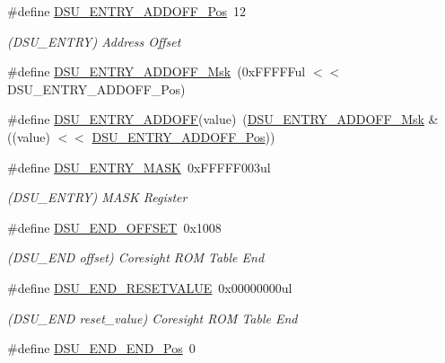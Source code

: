 \begin{DoxyCompactItemize}
\item 
\#define \mbox{\hyperlink{group___s_a_m_d21___d_s_u_gab71d31f158a348f32e1a357991d598e4}{D\+S\+U\+\_\+\+E\+N\+T\+R\+Y\+\_\+\+A\+D\+D\+O\+F\+F\+\_\+\+Pos}}~12
\begin{DoxyCompactList}\small\item\em (D\+S\+U\+\_\+\+E\+N\+T\+RY) Address Offset \end{DoxyCompactList}\item 
\#define \mbox{\hyperlink{group___s_a_m_d21___d_s_u_ga5aed4c8d11cb4035eb6e903e323f1bd2}{D\+S\+U\+\_\+\+E\+N\+T\+R\+Y\+\_\+\+A\+D\+D\+O\+F\+F\+\_\+\+Msk}}~(0x\+F\+F\+F\+F\+Ful $<$$<$ D\+S\+U\+\_\+\+E\+N\+T\+R\+Y\+\_\+\+A\+D\+D\+O\+F\+F\+\_\+\+Pos)
\item 
\#define \mbox{\hyperlink{group___s_a_m_d21___d_s_u_ga2b06caa1302db199b3b62849e2b5200f}{D\+S\+U\+\_\+\+E\+N\+T\+R\+Y\+\_\+\+A\+D\+D\+O\+FF}}(value)~(\mbox{\hyperlink{group___s_a_m_d21___d_s_u_ga5aed4c8d11cb4035eb6e903e323f1bd2}{D\+S\+U\+\_\+\+E\+N\+T\+R\+Y\+\_\+\+A\+D\+D\+O\+F\+F\+\_\+\+Msk}} \& ((value) $<$$<$ \mbox{\hyperlink{group___s_a_m_d21___d_s_u_gab71d31f158a348f32e1a357991d598e4}{D\+S\+U\+\_\+\+E\+N\+T\+R\+Y\+\_\+\+A\+D\+D\+O\+F\+F\+\_\+\+Pos}}))
\item 
\#define \mbox{\hyperlink{group___s_a_m_d21___d_s_u_gaf0cc765a53fad8ea6a66d738de6e1613}{D\+S\+U\+\_\+\+E\+N\+T\+R\+Y\+\_\+\+M\+A\+SK}}~0x\+F\+F\+F\+F\+F003ul
\begin{DoxyCompactList}\small\item\em (D\+S\+U\+\_\+\+E\+N\+T\+RY) M\+A\+SK Register \end{DoxyCompactList}\item 
\#define \mbox{\hyperlink{group___s_a_m_d21___d_s_u_gae6ea9aca4f5434a9e01445fc08782f59}{D\+S\+U\+\_\+\+E\+N\+D\+\_\+\+O\+F\+F\+S\+ET}}~0x1008
\begin{DoxyCompactList}\small\item\em (D\+S\+U\+\_\+\+E\+ND offset) Coresight R\+OM Table End \end{DoxyCompactList}\item 
\#define \mbox{\hyperlink{group___s_a_m_d21___d_s_u_gaa4380f101e160fd70e41789f57871f63}{D\+S\+U\+\_\+\+E\+N\+D\+\_\+\+R\+E\+S\+E\+T\+V\+A\+L\+UE}}~0x00000000ul
\begin{DoxyCompactList}\small\item\em (D\+S\+U\+\_\+\+E\+ND reset\+\_\+value) Coresight R\+OM Table End \end{DoxyCompactList}\item 
\#define \mbox{\hyperlink{group___s_a_m_d21___d_s_u_ga490d2f02762f42681fc4dcaa0db570bb}{D\+S\+U\+\_\+\+E\+N\+D\+\_\+\+E\+N\+D\+\_\+\+Pos}}~0

\end{DoxyCompactItemize}

